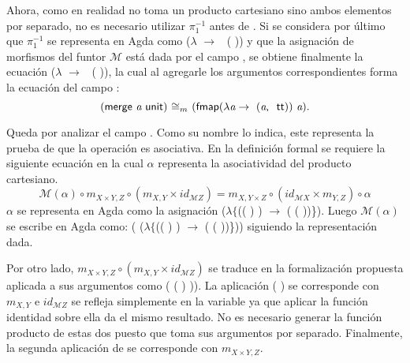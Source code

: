 Ahora, como en realidad  no toma un producto cartesiano sino ambos elementos por separado, no es necesario utilizar $\pi_1^{-1}$ antes de . Si se considera por último que $\pi_1^{-1}$ se representa en Agda como ($\lambda$  $\rightarrow$ \ ( )) y que la asignación de morfismos del funtor $\mathcal{M}$ está dada por el campo , se obtiene finalmente la ecuación    ($\lambda$  $\rightarrow$ \ ( )), la cual al agregarle los argumentos correspondientes forma la ecuación del campo :  
\begin{equation*}
(\AgdaField{merge} \ \AgdaBound{a} \ \AgdaField{unit}) \   \AgdaField{$\cong_m$} \ (\AgdaField{fmap} (\lambda \AgdaBound{a} \rightarrow \ (\AgdaBound{a} \AgdaInductiveConstructor{, \ tt} )) \ \AgdaBound{a}).
\end{equation*}

Queda por analizar el campo . Como su nombre lo indica, este representa la prueba de que la operación  es asociativa. En la definición formal se requiere la siguiente ecuación en la cual $\alpha$ representa la asociatividad del producto cartesiano.
\begin{equation*}
\mathcal{M}(\alpha) \circ m_{X \times Y, Z} \circ (m_{X,Y} \times id_{\mathcal{M}Z}) = m_{X, Y \times Z} \circ (id_{\mathcal{M}X} \times m_{Y,Z}) \circ \alpha
\end{equation*}
$\alpha$ se representa en Agda como la asignación ($\lambda \{$(( \AgdaInductiveConstructor{,} ) \AgdaInductiveConstructor{,} ) $\rightarrow$ ( \AgdaInductiveConstructor{,} ( \AgdaInductiveConstructor{,} ))\}). Luego $\mathcal{M}(\alpha)$ se escribe en Agda como: 
( ($\lambda \{$(( \AgdaInductiveConstructor{,} ) \AgdaInductiveConstructor{,} ) $\rightarrow$ ( \AgdaInductiveConstructor{,} ( \AgdaInductiveConstructor{,} ))\})) siguiendo la representación dada.

Por otro lado, $m_{X \times Y, Z} \circ (m_{X,Y} \times id_{\mathcal{M}Z})$ se traduce  en la formalización propuesta aplicada a sus argumentos como ( ( ) )). La aplicación ( ) se corresponde con $m_{X,Y}$ e $id_{\mathcal{M}Z}$ se refleja simplemente en la variable  ya que aplicar la función identidad sobre ella da el mismo resultado. No es necesario generar la función producto de estas dos puesto que  toma sus argumentos por separado. Finalmente, la segunda aplicación de  se corresponde con $m_{X \times Y, Z}$.

